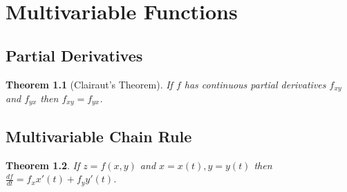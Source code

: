 \documentclass[letterpaper, 11pt, openany]{book}
\theoremstyle{mytheoremstyle}
\newtheorem{theorem}{Theorem}[section]
\theoremstyle{myexamplestyle}
\begin{document}
\newpage\thispagestyle{firstofchapter}
\chapter{Multivariable Functions}
\section{Partial Derivatives}
\setcounter{figure}{0}
\begin{theorem}[Clairaut's Theorem]\label{t:Clairauts}
    If \(f\) has continuous partial derivatives \(f_{xy}\) and \(f_{yx}\) then \(f_{xy}=f_{yx}\).
\end{theorem}

\section{Multivariable Chain Rule}
\setcounter{figure}{0}
\begin{theorem}\label{t:multivar-chain-rule}
    If \(z = f(x,y)\) and \(x = x(t), y=y(t)\) then \(\frac{df}{dt} = f_{x}x'(t) + f_{y}y'(t)\).
\end{theorem}
\end{document}
